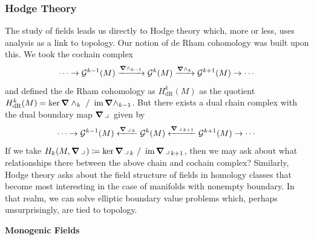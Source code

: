 \documentclass{article}
\begin{document}
\subsubsection{Hodge Theory}

The study of fields leads us directly to Hodge theory which, more or less, uses analysis as a link to topology. Our notion of de Rham cohomology was built upon this. We took the cochain complex
\begin{equation}
\cdots \to \mathcal{G}^{k-1}(M) \xrightarrow{\boldsymbol{\nabla} \wedge_{k-1}} \mathcal{G}^k(M) \xrightarrow{\boldsymbol{\nabla} \wedge_{k}} \mathcal{G}^{k+1}(M) \to \cdots
\end{equation}
and defined the de Rham cohomology as $H^k_{\mathrm{dR}}(M)$ as the quotient $H^k_{\mathrm{dR}}(M) = \ker \boldsymbol{\nabla} \wedge_k ~ / ~ \operatorname{im} \boldsymbol{\nabla} \wedge_{k-1}$. But there exists a dual chain complex with the dual boundary map $\boldsymbol{\nabla} \hspace*{.5mm}\lrcorner \hspace*{.5mm}$ given by
\begin{equation}
\cdots \to \mathcal{G}^{k-1}(M) \xleftarrow{\boldsymbol{\nabla} \hspace*{.5mm}\lrcorner \hspace*{.5mm}_{k}} \mathcal{G}^k(M) \xleftarrow{\boldsymbol{\nabla} \hspace*{.5mm}\lrcorner \hspace*{.5mm}_{k+1}} \mathcal{G}^{k+1}(M) \to \cdots
\end{equation}
If we take $H_k(M,\boldsymbol{\nabla} \hspace*{.5mm}\lrcorner \hspace*{.5mm})\coloneqq \ker \boldsymbol{\nabla} \hspace*{.5mm}\lrcorner \hspace*{.5mm}_k ~ / ~ \operatorname{im} \boldsymbol{\nabla} \hspace*{.5mm}\lrcorner \hspace*{.5mm}_{k+1}$, then we may ask about what relationships there between the above chain and cochain complex? Similarly, Hodge theory asks about the field structure of fields in homology classes that become most interesting in the case of manifolds with nonempty boundary. In that realm, we can solve elliptic boundary value problems which, perhaps unsurprisingly, are tied to topology.

\noindent \textbf{Monogenic Fields}
\end{document}
